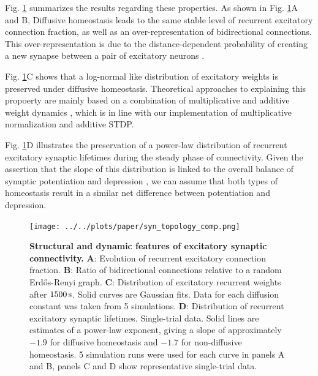 \documentclass[10pt,letterpaper]{article}
\begin{document}
Fig. \ref{Syn_Topology_Features} summarizes the results regarding these properties. As shown in Fig. \ref{Syn_Topology_Features}A and B, Diffusive homeostasis leads to the same stable level of recurrent excitatory connection fraction, as well as an over-representation of bidirectional connections. This over-representation is due to the distance-dependent probability of creating a new synapse between a pair of excitatory neurons \cite{SORN_Paper,Hoffmann_2017}.

Fig. \ref{Syn_Topology_Features}C shows that a log-normal like distribution of excitatory weights is preserved under diffusive homeostasis. 
Theoretical approaches to explaining this propoerty are mainly based on a combination of multiplicative and additive weight dynamics \cite{Loewenstein_Spine_Sizes,Pengsheng_2013,Statman_Synapses_2014,Loewenstein_2015}, which
is in line with our implementation of multiplicative normalization and additive STDP.

Fig. \ref{Syn_Topology_Features}D illustrates the preservation of a power-law distribution of recurrent excitatory synaptic lifetimes during the steady phase of connectivity. Given the assertion that the slope of this distribution is linked to the overall balance of synaptic potentiation and depression \cite{SORN_Paper}, we can assume that both types of homeostasis result in a similar net difference between potentiation and depression.

\begin{figure}
\begin{center}
\texttt{[image: ../../plots/paper/syn\_topology\_comp.png]}
\end{center}
\caption{{\bf Structural and dynamic features of excitatory synaptic connectivity.} \textbf{A}: Evolution of recurrent excitatory connection fraction. \textbf{B}: Ratio of bidirectional connections relative to a random Erd\H{o}s-Renyi graph. \textbf{C}: Distribution of excitatory recurrent weights after $\rm 1500\, s$. Solid curves are Gaussian fits. Data for each diffusion constant was taken from 5 simulations. \textbf{D}: Distribution of recurrent excitatory synaptic lifetimes. Single-trial data. Solid lines are estimates of a power-law exponent, giving a slope of approximately $\mathrm{-1.9}$ for diffusive homeostasis and $\mathrm{-1.7}$ for non-diffusive homeostasis. 5 simulation runs were used for each curve in panels A and B, panels C and D show representative single-trial data.}
\label{Syn_Topology_Features}
\end{figure}
\end{document}
